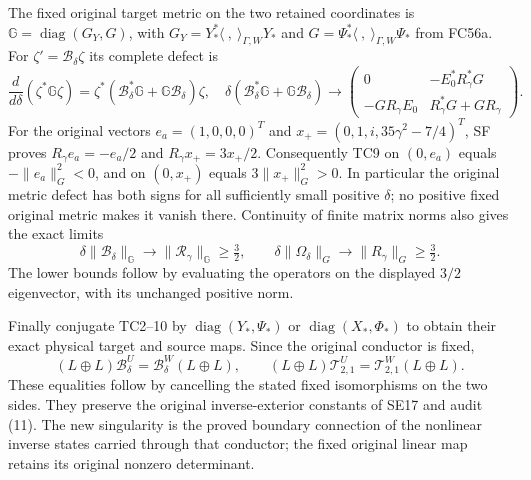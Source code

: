 \documentclass[11pt]{article}
\begin{document}
The fixed original target metric on the two retained coordinates is
$\mathbb G=\operatorname{diag}(G_Y,G)$, with
$G_Y=Y_*^*\langle\ ,\ \rangle_{\Gamma,W}Y_*$ and
$G=\Psi_*^*\langle\ ,\ \rangle_{\Gamma,W}\Psi_*$ from FC56a.
For $\zeta'=\mathcal B_\delta\zeta$ its complete defect is
\[
 \frac{d}{d\delta}(\zeta^*\mathbb G\zeta)
 =\zeta^*(\mathcal B_\delta^*\mathbb G+
                              \mathbb G\mathcal B_\delta)\zeta,
 \quad
 \delta(\mathcal B_\delta^*\mathbb G+
                 \mathbb G\mathcal B_\delta)
 \longrightarrow
 \begin{pmatrix}
 0&-E_0^*R_\gamma^*G\\-GR_\gamma E_0&R_\gamma^*G+GR_\gamma
 \end{pmatrix}. \tag{TC9}
\]
For the original vectors $e_a=(1,0,0,0)^T$ and
$x_+=(0,1,i,35\gamma^2-7/4)^T$, SF proves
$R_\gamma e_a=-e_a/2$ and $R_\gamma x_+=3x_+/2$.
Consequently TC9 on $(0,e_a)$ equals $-\|e_a\|_G^2<0$, and
on $(0,x_+)$ equals $3\|x_+\|_G^2>0$. In particular the original
metric defect has both signs for all sufficiently small positive
$\delta$; no positive fixed original metric makes it vanish there.
Continuity of finite matrix norms also gives the exact limits
\[
 \delta\|\mathcal B_\delta\|_{\mathbb G}
       \longrightarrow\|\mathcal R_\gamma\|_{\mathbb G}\ge\tfrac32,
 \qquad
 \delta\|\Omega_\delta\|_G\longrightarrow\|R_\gamma\|_G
       \ge\tfrac32. \tag{TC10}
\]
The lower bounds follow by evaluating the operators on the displayed
$3/2$ eigenvector, with its unchanged positive norm.

Finally conjugate TC2--10 by
$\operatorname{diag}(Y_*,\Psi_*)$ or
$\operatorname{diag}(X_*,\Phi_*)$ to obtain their exact physical
target and source maps. Since the original conductor is fixed,
\[
 (L\oplus L)\mathcal B^U_\delta
      =\mathcal B^W_\delta(L\oplus L),\qquad
 (L\oplus L)\mathcal T^U_{2,1}
      =\mathcal T^W_{2,1}(L\oplus L). \tag{TC11}
\]
These equalities follow by cancelling the stated fixed isomorphisms
on the two sides. They preserve the original inverse-exterior
constants of SE17 and audit (11). The new singularity is the proved
boundary connection of the nonlinear inverse states carried through
that conductor; the fixed original linear map retains its original
nonzero determinant.

\end{document}
